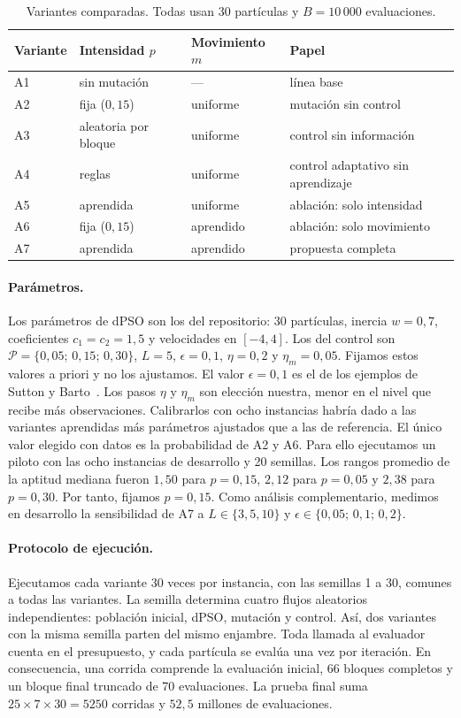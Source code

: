 \documentclass[10pt,a4paper]{article}
\newcommand{\dc}{{,}}%
\begin{document}
\begin{table}[htb]
\centering\small
\caption{Variantes comparadas. Todas usan 30 partículas y $B=10\,000$ evaluaciones.}
\label{tab:met}
\begin{tabular}{@{}llll@{}}
\toprule
Variante & Intensidad $p$ & Movimiento $m$ & Papel \\
\midrule
A1 & sin mutación & --- & línea base \\
A2 & fija ($0\dc15$) & uniforme & mutación sin control \\
A3 & aleatoria por bloque & uniforme & control sin información \\
A4 & reglas & uniforme & control adaptativo sin aprendizaje \\
A5 & aprendida & uniforme & ablación: solo intensidad \\
A6 & fija ($0\dc15$) & aprendido & ablación: solo movimiento \\
A7 & aprendida & aprendido & propuesta completa \\
\bottomrule
\end{tabular}
\end{table}

\paragraph{Parámetros.}
Los parámetros de dPSO son los del repositorio: 30 partículas, inercia $w=0\dc7$, coeficientes
$c_1=c_2=1\dc5$ y velocidades en $[-4,4]$. Los del control son
$\mathcal{P}=\{0\dc05;\,0\dc15;\,0\dc30\}$, $L=5$, $\epsilon=0\dc1$, $\eta=0\dc2$ y
$\eta_m=0\dc05$. Fijamos estos valores a priori y no los ajustamos. El valor $\epsilon=0\dc1$ es
el de los ejemplos de Sutton y Barto~\cite{sutton2018}. Los pasos $\eta$ y $\eta_m$ son elección
nuestra, menor en el nivel que recibe más observaciones. Calibrarlos con ocho instancias habría
dado a las variantes aprendidas más parámetros ajustados que a las de referencia. El único valor elegido con datos es la probabilidad de A2 y A6. Para ello
ejecutamos un piloto con las ocho instancias de desarrollo y 20 semillas. Los rangos promedio
de la aptitud mediana fueron $1\dc50$ para $p=0\dc15$, $2\dc12$ para $p=0\dc05$ y $2\dc38$ para
$p=0\dc30$. Por tanto, fijamos $p=0\dc15$. Como análisis complementario, medimos en desarrollo
la sensibilidad de A7 a $L\in\{3,5,10\}$ y $\epsilon\in\{0\dc05;\,0\dc1;\,0\dc2\}$.

\paragraph{Protocolo de ejecución.}
Ejecutamos cada variante 30 veces por instancia, con las semillas 1 a 30, comunes a todas las
variantes. La semilla determina cuatro flujos aleatorios independientes: población inicial,
dPSO, mutación y control. Así, dos variantes con la misma semilla parten del mismo enjambre.
Toda llamada al evaluador cuenta en el presupuesto, y cada partícula se evalúa una vez por
iteración. En consecuencia, una corrida comprende la evaluación inicial, 66 bloques completos y
un bloque final truncado de 70 evaluaciones. La prueba final suma $25\times7\times30=5250$
corridas y $52\dc5$ millones de evaluaciones.
\end{document}
